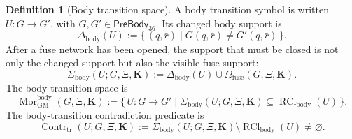 \documentclass[11pt]{article}
\theoremstyle{definition}
\newtheorem{definition}{Definition}
\theoremstyle{plain}
\DeclareMathOperator{\Contr}{Contr}
\DeclareMathOperator{\Mor}{Mor}
\DeclareMathOperator{\RCl}{RCl}
\begin{document}
\begin{definition}[Body transition space]
A body transition symbol is written \(U:G\to G'\), with
\(G,G'\in\mathsf{PreBody}_{36}\).  Its changed body support is
\[
  \Delta_{\mathrm{body}}(U)
  :=
  \{\,(q,\bar r)\mid G(q,\bar r)\ne G'(q,\bar r)\,\}.
\]
After a fuse network has been opened, the support that must be closed is
not only the changed support but also the visible fuse support:
\[
  \Sigma_{\mathrm{body}}(U;G,\Xi,\mathbf K)
  :=
  \Delta_{\mathrm{body}}(U)
  \cup
  \Omega_{\mathrm{fuse}}(G,\Xi,\mathbf K).
\]
The body transition space is
\[
  \Mor^{\mathrm{body}}_{\mathrm{GM}}(G,\Xi,\mathbf K)
  :=
  \{\,U:G\to G'\mid
  \Sigma_{\mathrm{body}}(U;G,\Xi,\mathbf K)
  \subseteq\RCl_{\mathrm{body}}(U)\,\}.
\]
The body-transition contradiction predicate is
\[
  \Contr_{\mathrm{tr}}(U;G,\Xi,\mathbf K)
  :=
  \Sigma_{\mathrm{body}}(U;G,\Xi,\mathbf K)
  \setminus\RCl_{\mathrm{body}}(U)
  \ne\varnothing .
\]
\end{definition}
\end{document}

